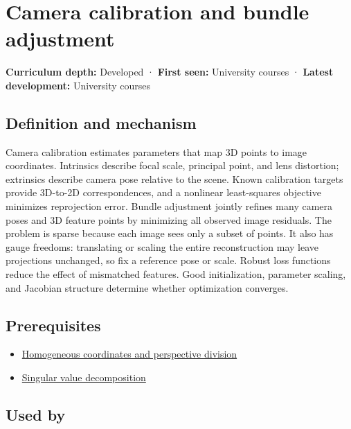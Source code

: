 \hypertarget{appendix-3ee9861904d5}{}\label{referencestart:appendix-3ee9861904d5}
\section{Camera calibration and bundle adjustment}\label{appendix-3ee9861904d5-camera-calibration-and-bundle-adjustment}

\textbf{Curriculum depth:} Developed · \textbf{First seen:} University courses · \textbf{Latest development:} University courses

\subsection{Definition and mechanism}\label{appendix-3ee9861904d5-definition-and-mechanism}

Camera calibration estimates parameters that map 3D points to image coordinates. Intrinsics describe focal scale, principal point, and lens distortion; extrinsics describe camera pose relative to the scene. Known calibration targets provide 3D-to-2D correspondences, and a nonlinear least-squares objective minimizes reprojection error. Bundle adjustment jointly refines many camera poses and 3D feature points by minimizing all observed image residuals. The problem is sparse because each image sees only a subset of points. It also has gauge freedoms: translating or scaling the entire reconstruction may leave projections unchanged, so fix a reference pose or scale. Robust loss functions reduce the effect of mismatched features. Good initialization, parameter scaling, and Jacobian structure determine whether optimization converges.

\subsection{Prerequisites}\label{appendix-3ee9861904d5-prerequisites}

\begin{itemize}
\tightlist
\item
  \hyperref[appendix-cb3b26862282]{Homogeneous coordinates and perspective division}
\item
  \hyperref[appendix-1fad5e7f36fa]{Singular value decomposition}
\end{itemize}

\subsection{Used by}\label{appendix-3ee9861904d5-used-by}

